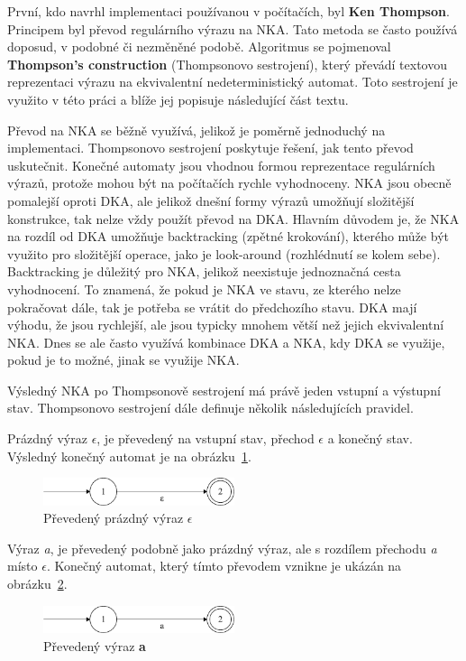 První, kdo navrhl implementaci používanou v počítačích, byl \textbf{Ken Thompson}.
Principem byl převod regulárního výrazu na NKA.
Tato metoda se často používá doposud, v podobné či nezměněné podobě.
Algoritmus se pojmenoval \textbf{Thompson's construction} (Thompsonovo sestrojení), který převádí textovou reprezentaci výrazu na ekvivalentní nedeterministický automat.
Toto sestrojení je využito v této práci a blíže jej popisuje následující část textu.

Převod na NKA se běžně využívá, jelikož je poměrně jednoduchý na implementaci.
Thompsonovo sestrojení poskytuje řešení, jak tento převod uskutečnit.
Konečné automaty jsou vhodnou formou reprezentace regulárních výrazů, protože mohou být na počítačích rychle vyhodnoceny.
NKA jsou obecně pomalejší oproti DKA, ale jelikož dnešní formy výrazů umožňují složitější konstrukce, tak nelze vždy použít převod na DKA.
Hlavním důvodem je, že NKA na rozdíl od DKA umožňuje backtracking (zpětné krokování), kterého může být využito pro složitější operace, jako je look-around (rozhlédnutí se kolem sebe).
Backtracking je důležitý pro NKA, jelikož neexistuje jednoznačná cesta vyhodnocení.
To znamená, že pokud je NKA ve stavu, ze kterého nelze pokračovat dále, tak je potřeba se vrátit do předchozího stavu.
DKA mají výhodu, že jsou rychlejší, ale jsou typicky mnohem větší než jejich ekvivalentní NKA.
Dnes se ale často využívá kombinace DKA a NKA, kdy DKA se využije, pokud je to možné, jinak se využije NKA.

Výsledný NKA po Thompsonově sestrojení má právě jeden vstupní a výstupní stav. 
Thompsonovo sestrojení dále definuje několik následujících pravidel.

Prázdný výraz \textit{$\epsilon$}, je převedený na vstupní stav, přechod \textit{$\epsilon$} a konečný stav.
Výsledný konečný automat je na obrázku~\ref{fig:NFAepsilon}.
\begin{figure}[!h]
	\centering
	\includegraphics[width=0.5\textwidth]{Figures/NFA_epsilon.pdf}
	\caption{Převedený prázdný výraz \textbf{$\epsilon$}}
	\label{fig:NFAepsilon}
\end{figure}

Výraz \textit{a}, je převedený podobně jako prázdný výraz, ale s rozdílem přechodu \textit{a} místo \textit{$\epsilon$}.
Konečný automat, který tímto převodem vznikne je ukázán na obrázku~\ref{fig:NFAa}.
\begin{figure}[!h]
	\centering
	\includegraphics[width=0.5\textwidth]{Figures/NFA_a.pdf}
	\caption{Převedený výraz \textbf{a}}
	\label{fig:NFAa}
\end{figure}

